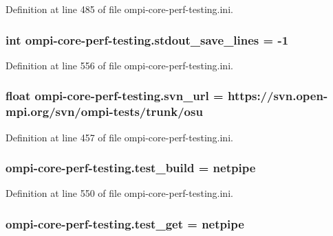 Definition at line 485 of file ompi-\/core-\/perf-\/testing.\-ini.

\hypertarget{namespaceompi-core-perf-testing_aa0d1bbab78860404add1c8f3dd5cd00a}{
\subsubsection[{stdout\-\_\-save\-\_\-lines}]{\setlength{\rightskip}{0pt plus 5cm}int ompi-\/core-\/perf-\/testing.\-stdout\-\_\-save\-\_\-lines = -\/1}}\label{namespaceompi-core-perf-testing_aa0d1bbab78860404add1c8f3dd5cd00a}


Definition at line 556 of file ompi-\/core-\/perf-\/testing.\-ini.

\hypertarget{namespaceompi-core-perf-testing_a886629d41ede129accbc04e99dc7b110}{
\subsubsection[{svn\-\_\-url}]{\setlength{\rightskip}{0pt plus 5cm}float ompi-\/core-\/perf-\/testing.\-svn\-\_\-url = https\-://svn.\-open-\/mpi.\-org/svn/ompi-\/tests/trunk/osu}}\label{namespaceompi-core-perf-testing_a886629d41ede129accbc04e99dc7b110}


Definition at line 457 of file ompi-\/core-\/perf-\/testing.\-ini.

\hypertarget{namespaceompi-core-perf-testing_a84f687adcf3641ad705d066e5e141f8f}{
\subsubsection[{test\-\_\-build}]{\setlength{\rightskip}{0pt plus 5cm}ompi-\/core-\/perf-\/testing.\-test\-\_\-build = netpipe}}\label{namespaceompi-core-perf-testing_a84f687adcf3641ad705d066e5e141f8f}


Definition at line 550 of file ompi-\/core-\/perf-\/testing.\-ini.

\hypertarget{namespaceompi-core-perf-testing_a725e3158d8ea5ff2ed5a27ad764902fe}{
\subsubsection[{test\-\_\-get}]{\setlength{\rightskip}{0pt plus 5cm}ompi-\/core-\/perf-\/testing.\-test\-\_\-get = netpipe}}\label{namespaceompi-core-perf-testing_a725e3158d8ea5ff2ed5a27ad764902fe}



